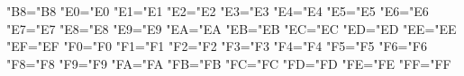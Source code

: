 %
    \lccode"B8="B8 %
    \lccode"E0="E0 %
    \lccode"E1="E1 %
    \lccode"E2="E2 %
    \lccode"E3="E3 %
    \lccode"E4="E4 %
    \lccode"E5="E5 %
    \lccode"E6="E6 %
    \lccode"E7="E7 %
    \lccode"E8="E8 %
%
    \lccode"E9="E9 %
    \lccode"EA="EA %
    \lccode"EB="EB %
    \lccode"EC="EC %
    \lccode"ED="ED %
    \lccode"EE="EE %
    \lccode"EF="EF %
    \lccode"F0="F0 %
    \lccode"F1="F1 %
    \lccode"F2="F2 %
%
    \lccode"F3="F3 %
    \lccode"F4="F4 %
    \lccode"F5="F5 %
    \lccode"F6="F6 %
    \lccode"F8="F8 %
    \lccode"F9="F9 %
    \lccode"FA="FA %
    \lccode"FB="FB %
    \lccode"FC="FC %
    \lccode"FD="FD %
%
    \lccode"FE="FE %
    \lccode"FF="FF %
  \fi
%
  
\else
  
\fi
%
\endgroup
%
\endinput

